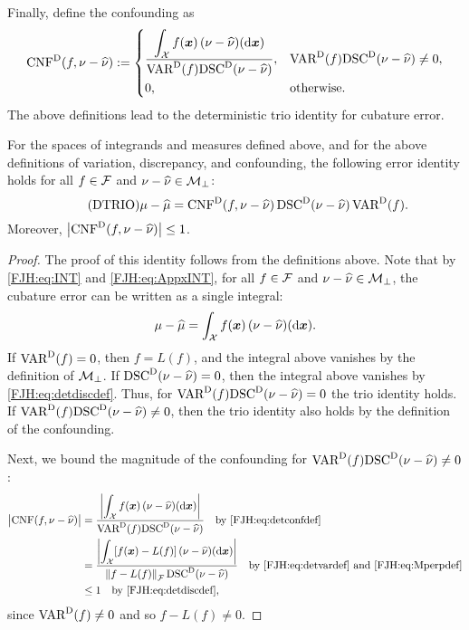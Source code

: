 \documentclass[graybox,footinfo]{svmult}
\begin{document}
Finally, define the confounding as 
	\begin{equation} \label{FJH:eq:detconfdef}
\algn^\Dt(f,\nu - \hnu): =  \begin{cases} \displaystyle 
\frac{\displaystyle\int_{\calX} f(\bsx) \, (\nu - \hnu)(\D 
	\bsx)}{\Var^\Dt(f)\disc^\Dt(\nu - \hnu)},  & 
\Var^\Dt(f)\disc^\Dt(\nu - \hnu) \ne 0, \\[2ex]
0, & \text{otherwise}.
\end{cases}
\end{equation}
The above definitions lead to the deterministic trio identity for cubature 
error.

\begin{theorem}  \label{FJH:thm:dtrio} For the spaces 
of integrands and 
measures defined above, and for the above definitions of variation, discrepancy, and 
confounding, the following error identity holds for all $f \in {\mathcal{F}}$ and $\nu - \widehat{\nu}  \in 
{\mathcal{M}}_\bot$: 
\begin{equation} \tag{DTRIO} \label{FJH:eq:dtrio}
\mu - \hmu  = \algn^\Dt(f,\nu - \hnu) \, \disc^\Dt(\nu - \hnu) \, \Var^{\Dt}(f).
\end{equation}
Moreover, $\bigl \lvert \textup{CNF}^{\textup{D}}(f,\nu - \widehat{\nu}) \bigr \rvert \le 1$. 
\end{theorem}
\begin{proof}  The proof of this identity follows from the definitions above.  Note that by 
\eqref{FJH:eq:INT} and \eqref{FJH:eq:AppxINT}, for all $f \in {\mathcal{F}}$ and $\nu - \widehat{\nu}  \in 
{\mathcal{M}}_\bot$, the cubature 
error 
can be written as a 
single integral:
	\begin{equation} \label{FJH:eq:err_as_int}
	\mu - \hmu   =  \int_{\calX} f(\bsx) \, (\nu - \hnu)(\D \bsx).
	\end{equation}
	If $\textup{VAR}^{\textup{D}}(f) = 0$, then $f = L(f)$, and the integral above vanishes by the 
	definition of ${\mathcal{M}}_{\bot}$.  If $\textup{DSC}^{\textup{D}}(\nu - \widehat{\nu}) = 0$, then the integral above 
	vanishes by \eqref{FJH:eq:detdiscdef}.  Thus, for $\textup{VAR}^{\textup{D}}(f) \textup{DSC}^{\textup{D}}(\nu - \widehat{\nu}) = 
	0$ 
	the trio identity holds. If $\textup{VAR}^{\textup{D}}(f) \textup{DSC}^{\textup{D}}(\nu - \widehat{\nu}) \ne 0$, then the trio 
	identity also holds by the definition of the confounding.
	
	Next, we bound the magnitude of the confounding for $\textup{VAR}^{\textup{D}}(f) \textup{DSC}^{\textup{D}}(\nu - 
	\widehat{\nu}) \ne 0$: 
	\begin{align*}
	\bigl \lvert \textup{CNF}(f,\nu - \widehat{\nu}) \bigr \rvert & = 
		\frac{\biggl \lvert\displaystyle\int_{{\mathcal{X}}} f({\boldsymbol{x}}) \, (\nu - \widehat{\nu})(\mathrm{d} 
			{\boldsymbol{x}}) \biggr \rvert}{\textup{VAR}^{\textup{D}}(f)\textup{DSC}^{\textup{D}}(\nu - \widehat{\nu})} \quad \text{by 
			\eqref{FJH:eq:detconfdef}}\\
		& = \frac{\biggl \lvert\displaystyle\int_{{\mathcal{X}}} [f({\boldsymbol{x}}) - L(f)] \, (\nu - \widehat{\nu})(\mathrm{d} 
			{\boldsymbol{x}}) \biggr \rvert}{\left \lVert f-L(f) \right \rVert_{{\mathcal{F}}}\textup{DSC}^{\textup{D}}(\nu - \widehat{\nu})} \quad \text{by 
			\eqref{FJH:eq:detvardef} and \eqref{FJH:eq:Mperpdef}} \\
		& \le 1 \quad \text{by \eqref{FJH:eq:detdiscdef}},
\end{align*}
since $\textup{VAR}^{\textup{D}}(f) \ne 0$ and so $f - L(f) \ne 0$.
\end{proof}
\end{document}
